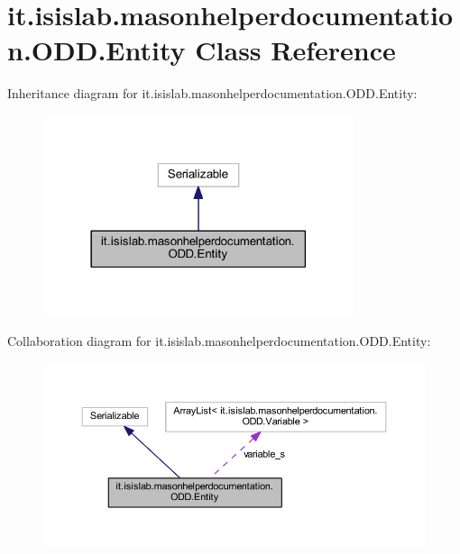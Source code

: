 \hypertarget{classit_1_1isislab_1_1masonhelperdocumentation_1_1_o_d_d_1_1_entity}{\section{it.\-isislab.\-masonhelperdocumentation.\-O\-D\-D.\-Entity Class Reference}
\label{classit_1_1isislab_1_1masonhelperdocumentation_1_1_o_d_d_1_1_entity}
}


Inheritance diagram for it.\-isislab.\-masonhelperdocumentation.\-O\-D\-D.\-Entity\-:
\nopagebreak
\begin{figure}[H]
\begin{center}
\leavevmode
\includegraphics[width=258pt]{classit_1_1isislab_1_1masonhelperdocumentation_1_1_o_d_d_1_1_entity__inherit__graph}
\end{center}
\end{figure}


Collaboration diagram for it.\-isislab.\-masonhelperdocumentation.\-O\-D\-D.\-Entity\-:
\nopagebreak
\begin{figure}[H]
\begin{center}
\leavevmode
\includegraphics[width=350pt]{classit_1_1isislab_1_1masonhelperdocumentation_1_1_o_d_d_1_1_entity__coll__graph}
\end{center}
\end{figure}
